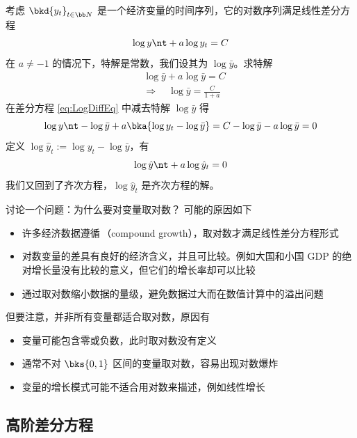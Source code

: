 考虑 \(\bkd{y_t}_{t\in\bb N}\) 是一个经济变量的时间序列，它的对数序列满足线性差分方程
\begin{align}\label{eq:LogDiffEq}
    \log y\nt+a\log y_t=C
\end{align}
在 \(a\neq -1\) 的情况下，特解是常数，我们设其为 \(\log\bar y\)。求特解
\begin{align}
    &\log\bar y + a\log\bar y = C \label{eq:LogDiffEqTrend}\\
    &\Rightarrow \quad \log \bar y = \frac C{1+a}
\end{align}
在差分方程 \ref{eq:LogDiffEq} 中减去特解 \(\log\bar y\) 得
\begin{equation}
    \log y\nt - \log\bar y + a\bka{\log y_t - \log\bar y} = C - \log\bar y - a\log\bar y = 0
\end{equation}
定义 \(\log\hat y_t := \log y_t - \log\bar y\)，有
\begin{equation}
    \log\hat y\nt + a\log\hat y_t = 0\label{eq:LogDiffEqCycle}
\end{equation}
我们又回到了齐次方程，\(\log\hat y_t\) 是齐次方程的解。

讨论一个问题：{\kaiti 为什么要对变量取对数？} 可能的原因如下
\begin{itemize}
    \item 许多经济数据遵循\,（compound growth），取对数才满足线性差分方程形式
    \item 对数变量的差具有良好的经济含义，并且可比较。例如大国和小国 GDP 的绝对增长量没有比较的意义，但它们的增长率却可以比较
    \item 通过取对数缩小数据的量级，避免数据过大而在数值计算中的溢出问题
\end{itemize}
但要注意，并非所有变量都适合取对数，原因有
\begin{itemize}
    \item 变量可能包含零或负数，此时取对数没有定义
    \item 通常不对 \(\bks{0,1}\) 区间的变量取对数，容易出现对数爆炸
    \item 变量的增长模式可能不适合用对数来描述，例如线性增长
\end{itemize}

\subsection{高阶差分方程}\label{subsec:HDiffEqu}

